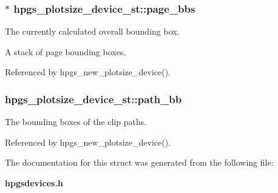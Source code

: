 \subsubsection[{page\_\-bbs}]{$\ast$ {\bf hpgs\_\-plotsize\_\-device\_\-st::page\_\-bbs}}\label{structhpgs__plotsize__device__st_a016fbde7815a9034098f94cb60e0dcdd}
The currently calculated overall bounding box.

A stack of page bounding boxes. 

Referenced by hpgs\_\-new\_\-plotsize\_\-device().

\subsubsection[{path\_\-bb}]{ {\bf hpgs\_\-plotsize\_\-device\_\-st::path\_\-bb}}\label{structhpgs__plotsize__device__st_a35db4a71c68d2dadd16f2fe5628af408}
The bounding boxes of the clip paths. 

Referenced by hpgs\_\-new\_\-plotsize\_\-device().



The documentation for this struct was generated from the following file:\begin{DoxyCompactItemize}
\item 
{\bf hpgsdevices.h}\end{DoxyCompactItemize}
